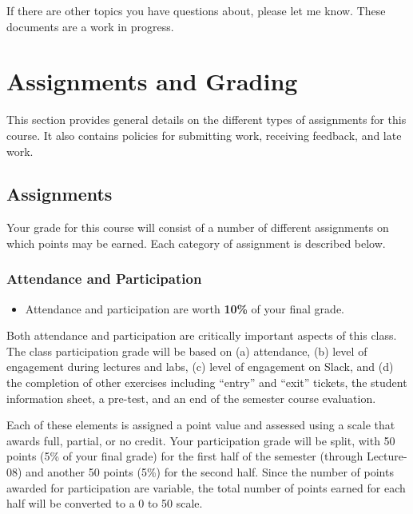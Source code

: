 \documentclass[]{book}
\newenvironment{rmdblock}[1]
  {\begin{shaded*}
  \begin{itemize}
  \renewcommand{\labelitemi}{
    \raisebox{-.7\height}[0pt][0pt]{
      {\setkeys{Gin}{width=3em,keepaspectratio}\texttt{[image: images/\#1]}}
    }
  }
  \item
  }
  {
  \end{itemize}
  \end{shaded*}
  }
\newenvironment{rmdtip}
  {\begin{rmdblock}{tip}}
  {\end{rmdblock}}
\begin{document}
If there are other topics you have questions about, please let me know. These documents are a work in progress.

\hypertarget{assignments-and-grading}{%
\chapter{Assignments and Grading}\label{assignments-and-grading}}

This section provides general details on the different types of assignments for this course. It also contains policies for submitting work, receiving feedback, and late work.

\hypertarget{assignments}{%
\section{Assignments}\label{assignments}}

Your grade for this course will consist of a number of different assignments on which points may be earned. Each category of assignment is described below.

\hypertarget{attendance-and-participation-1}{%
\subsection{Attendance and Participation}\label{attendance-and-participation-1}}

\begin{rmdtip}
Attendance and participation are worth \textbf{10\%} of your final
grade.
\end{rmdtip}

Both attendance and participation are critically important aspects of this class. The class participation grade will be based on (a) attendance, (b) level of engagement during lectures and labs, (c) level of engagement on Slack, and (d) the completion of other exercises including ``entry'' and ``exit'' tickets, the student information sheet, a pre-test, and an end of the semester course evaluation.

Each of these elements is assigned a point value and assessed using a scale that awards full, partial, or no credit. Your participation grade will be split, with 50 points (5\% of your final grade) for the first half of the semester (through Lecture-08) and another 50 points (5\%) for the second half. Since the number of points awarded for participation are variable, the total number of points earned for each half will be converted to a 0 to 50 scale.
\end{document}
